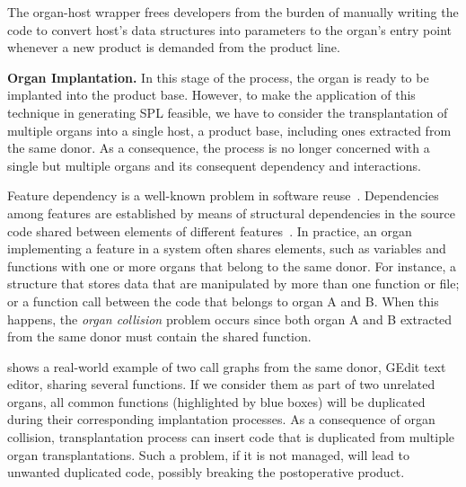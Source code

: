 The organ-host wrapper frees developers from the burden of manually writing the code to convert host's data structures into parameters to the organ's entry point whenever a new product is demanded from the product line.

\label{implantation}
\textbf{Organ Implantation.} In this stage of the process, the organ is ready to be implanted into the product base. 
However, to make the application of this technique in generating SPL feasible, we have to consider the transplantation of multiple organs into a single host, a product base, including ones extracted from the same donor. 
As a consequence, the process is no longer concerned with a single but multiple organs and its consequent dependency and interactions.

Feature dependency is a well-known problem in software reuse~\cite{Ribeiro2011}. Dependencies among features are established by means of structural dependencies in the source code shared between elements of different features~\cite{CafeoA2016}. In practice, an organ implementing a feature in a system often shares elements, such as variables and functions with one or more organs that belong to the same donor. For instance, a structure that stores data that are manipulated by more than one function or file; or a function call between the code that belongs to organ A and B. When this happens, the \emph{organ collision} problem occurs since both organ A and B extracted from the same donor must contain the shared function. 

 shows a real-world example of two call graphs from the same donor, GEdit text editor, sharing several functions. If we consider them as part of two unrelated organs, all common functions (highlighted by blue boxes) will be duplicated during their corresponding implantation processes. As a consequence of organ collision, transplantation process can insert code that is duplicated from multiple organ transplantations. Such a problem, if it is not managed, will lead to unwanted duplicated code, possibly breaking the postoperative product. 

